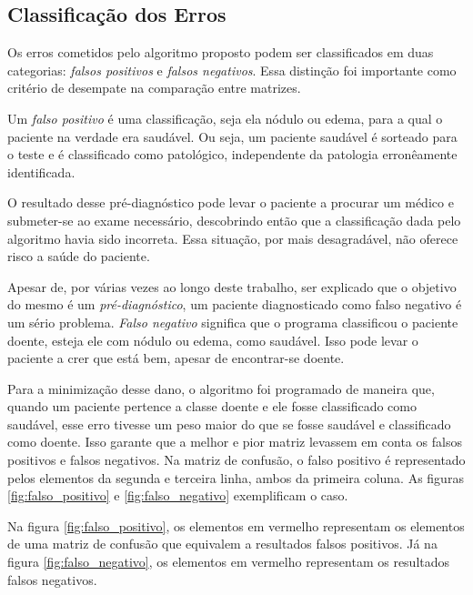 \documentclass[a4paper,12pt,oneside]{report}
\begin{document}
\subsection{Classifica\c{c}\~{a}o dos Erros}
\label{subsec:tipos_de_erro}
\hspace*{+15pt} Os erros cometidos pelo algoritmo proposto podem ser classificados em duas categorias: \emph{falsos positivos} e \emph{falsos negativos}. Essa distin\c{c}\~{a}o foi importante como crit\'{e}rio de desempate na compara\c{c}\~{a}o entre matrizes. 
\\
\par Um \emph{falso positivo} \'{e} uma classifica\c{c}\~{a}o, seja ela n\'{o}dulo ou edema, para a qual o paciente na verdade era saud\'{a}vel. Ou seja, um paciente saud\'{a}vel \'{e} sorteado para o teste e \'{e} classificado como patol\'{o}gico, independente da patologia erron\^{e}amente identificada. 
\\
\par O resultado desse pr\'{e}-diagn\'{o}stico pode levar o paciente a procurar um m\'{e}dico e submeter-se ao exame necess\'{a}rio, descobrindo ent\~{a}o que a classifica\c{c}\~{a}o dada pelo algoritmo havia sido incorreta. Essa situa\c{c}\~{a}o, por mais desagrad\'{a}vel, n\~{a}o o\-fe\-re\-ce risco a sa\'{u}de do paciente. 
\\
\par Apesar de, por v\'{a}rias vezes ao longo deste trabalho, ser explicado que o objetivo do mesmo \'{e} um \emph{pr\'{e}-diagn\'{o}stico}, um paciente diagnosticado como falso negativo \'{e} um s\'{e}rio problema. \emph {Falso negativo} significa que o programa classificou o paciente doente, esteja ele com n\'{o}dulo ou edema, como saud\'{a}vel. Isso pode levar o paciente a crer que est\'{a} bem, apesar de encontrar-se doente. 
\\
\par Para a minimiza\c{c}\~{a}o desse dano, o algoritmo foi programado de maneira que, quando um paciente pertence a classe doente e ele fosse classificado como saud\'{a}vel, esse erro tivesse um peso maior do que se fosse saud\'{a}vel e classificado como doente. Isso garante que a melhor e pior matriz levassem em conta os falsos positivos e falsos negativos. Na matriz de confus\~{a}o, o falso positivo \'{e} representado pelos elementos da segunda e terceira linha, ambos da primeira coluna. As figuras \ref{fig:falso_positivo} e \ref{fig:falso_negativo} exemplificam o caso. 
\\
\par Na figura \ref{fig:falso_positivo}, os elementos em vermelho representam os elementos de uma matriz de confus\~{a}o que equivalem a resultados falsos positivos.  J\'{a} na figura \ref{fig:falso_negativo}, os elementos em vermelho representam os resultados falsos negativos. 
\end{document}
